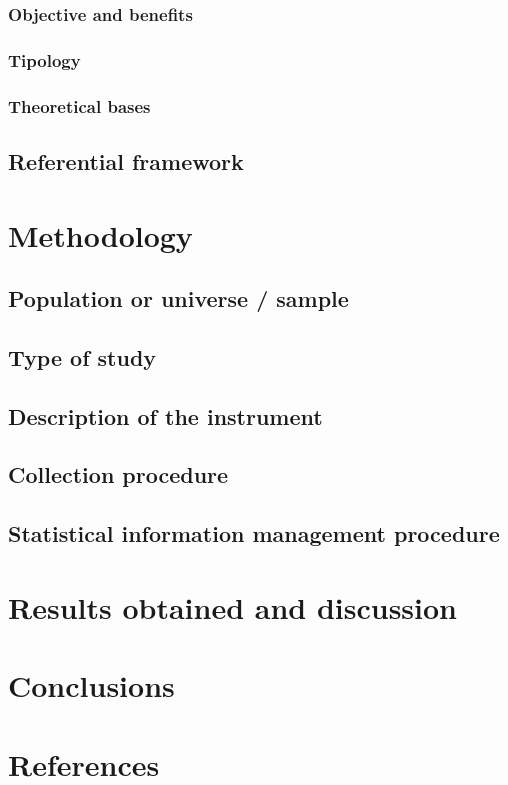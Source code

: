 \documentclass[preprint,12pt]{elsarticle}
\begin{document}
		\subsubsection{Objective and benefits}
		\subsubsection{Tipology}
		\subsubsection{Theoretical bases}
	\subsection{Referential framework}
\newpage
\section{Methodology}
	\subsection{Population or universe / sample}
	\subsection{Type of study}
	\subsection{Description of the instrument}
	\subsection{Collection procedure}
	\subsection{Statistical information management procedure}

\newpage
\section{Results obtained and discussion}

\newpage
\section{Conclusions}

\newpage
\section{References}

\end{document}
